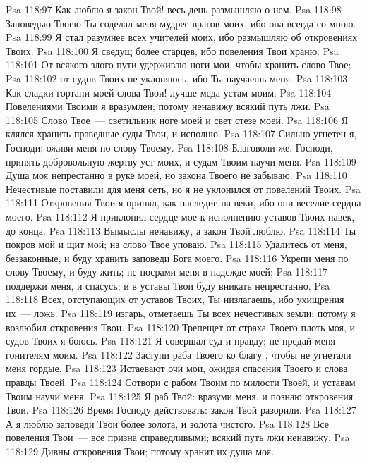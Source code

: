 \vs Psa 118:97 Как люблю я закон Твой! весь день размышляю о нем.
\vs Psa 118:98 Заповедью Твоею Ты соделал меня мудрее врагов моих, ибо она всегда со мною.
\vs Psa 118:99 Я стал разумнее всех учителей моих, ибо размышляю об откровениях Твоих.
\vs Psa 118:100 Я сведущ более старцев, ибо повеления Твои храню.
\vs Psa 118:101 От всякого злого пути удерживаю ноги мои, чтобы хранить слово Твое;
\vs Psa 118:102 от судов Твоих не уклоняюсь, ибо Ты научаешь меня.
\vs Psa 118:103 Как сладки гортани моей слова Твои! лучше меда устам моим.
\vs Psa 118:104 Повелениями Твоими я вразумлен; потому ненавижу всякий путь лжи.
\vs Psa 118:105 Слово Твое~--- светильник ноге моей и свет стезе моей.
\vs Psa 118:106 Я клялся хранить праведные суды Твои, и исполню.
\vs Psa 118:107 Сильно угнетен я, Господи; оживи меня по слову Твоему.
\vs Psa 118:108 Благоволи же, Господи, принять добровольную жертву уст моих, и судам Твоим научи меня.
\vs Psa 118:109 Душа моя непрестанно в руке моей, но закона Твоего не забываю.
\vs Psa 118:110 Нечестивые поставили для меня сеть, но я не уклонился от повелений Твоих.
\vs Psa 118:111 Откровения Твои я принял, как наследие на веки, ибо они веселие сердца моего.
\vs Psa 118:112 Я приклонил сердце мое к исполнению уставов Твоих навек, до конца.
\vs Psa 118:113 Вымыслы  ненавижу, а закон Твой люблю.
\vs Psa 118:114 Ты покров мой и щит мой; на слово Твое уповаю.
\vs Psa 118:115 Удалитесь от меня, беззаконные, и буду хранить заповеди Бога моего.
\vs Psa 118:116 Укрепи меня по слову Твоему, и буду жить; не посрами меня в надежде моей;
\vs Psa 118:117 поддержи меня, и спасусь; и в уставы Твои буду вникать непрестанно.
\vs Psa 118:118 Всех, отступающих от уставов Твоих, Ты низлагаешь, ибо ухищрения их~--- ложь.
\vs Psa 118:119  изгарь, отметаешь Ты всех нечестивых земли; потому я возлюбил откровения Твои.
\vs Psa 118:120 Трепещет от страха Твоего плоть моя, и судов Твоих я боюсь.
\vs Psa 118:121 Я совершал суд и правду; не предай меня гонителям моим.
\vs Psa 118:122 Заступи раба Твоего ко благу , чтобы не угнетали меня гордые.
\vs Psa 118:123 Истаевают очи мои, ожидая спасения Твоего и слова правды Твоей.
\vs Psa 118:124 Сотвори с рабом Твоим по милости Твоей, и уставам Твоим научи меня.
\vs Psa 118:125 Я раб Твой: вразуми меня, и познаю откровения Твои.
\vs Psa 118:126 Время Господу действовать: закон Твой разорили.
\vs Psa 118:127 А я люблю заповеди Твои более золота, и золота чистого.
\vs Psa 118:128 Все повеления Твои~--- все призна справедливыми; всякий путь лжи ненавижу.
\vs Psa 118:129 Дивны откровения Твои; потому хранит их душа моя.
